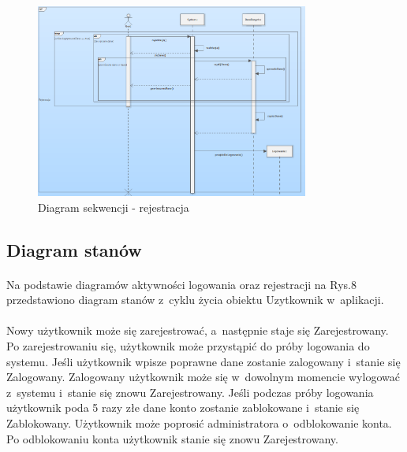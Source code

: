 \documentclass[12pt, letterpaper]{article}
\begin{document}
\begin{figure}[h]
  \centering
      \includegraphics[width=0.8\textwidth]{seqDiagramRejestracja}
  \caption{Diagram sekwencji - rejestracja}
\end{figure}
		
\newpage		
\subsection{Diagram stanów}
\paragraph{}
Na podstawie diagramów aktywności logowania oraz rejestracji na Rys.8 przedstawiono diagram stanów z~cyklu życia obiektu Uzytkownik w~aplikacji.\\
		
\paragraph{}
Nowy użytkownik może się zarejestrować, a~następnie staje się Zarejestrowany. Po zarejestrowaniu się, użytkownik może przystąpić do próby logowania do systemu. Jeśli użytkownik wpisze poprawne dane zostanie zalogowany i~stanie się Zalogowany. Zalogowany użytkownik może się w~dowolnym momencie wylogować z~systemu i~stanie się znowu Zarejestrowany. Jeśli podczas próby logowania użytkownik poda 5 razy złe dane konto zostanie zablokowane i~stanie się Zablokowany. Użytkownik może poprosić administratora o~odblokowanie konta. Po odblokowaniu konta użytkownik stanie się znowu Zarejestrowany.
		
\end{document}
